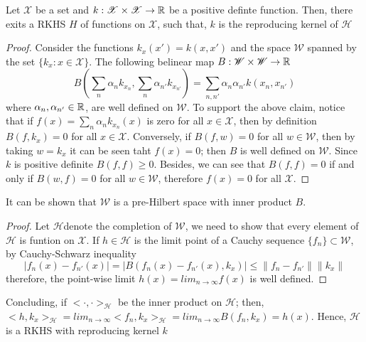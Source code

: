 \begin{theorem}
Let $\mathscr{X}$ be a set and $k: \mathscr{X} \times \mathscr{X} \rightarrow \mathbb{R}$ be a positive definte function. Then, there exits a RKHS $H$ of functions on $\mathscr{X}$, such that, $k$ is the reproducing kernel of $\mathscr{H}$
\end{theorem}

\begin{proof}
 Consider the functions $k_x(x')=k(x,x')$ and the space $\mathscr{W}$ spanned by the set $\{k_x: x \in \mathscr{X} \}$. The following belinear map $B: \mathscr{W} \times \mathscr{W} \rightarrow \mathbb{R}$
 \begin{equation}
     B\left( \sum_n \alpha_nk_{x_n}, \sum_n \alpha_{n'}k_{x_{n'}}\right)=\sum_{n,n'}\alpha_n\alpha_{n'}k(x_{n},x_{n'})
 \end{equation}
 where $\alpha_n, \alpha_{n'} \in \mathbb{R}$, are well defined on $\mathscr{W}$. To support the above claim, notice that if $f(x)=\sum_n\alpha_nk_{x_n}(x)$ is zero for all $x \in \mathscr{X}$, then by definition $B(f,k_x)=0$ for all $x \in \mathscr{X}$. Conversely, if $B(f,w)=0$ for all $w \in \mathscr{W}$, then by taking $w=k_x$ it can be seen taht $f(x)=0$; then $B$ is well defined on $\mathscr{W}$. Since $k$ is positive definite $B(f,f) \geq 0$. Besides, we can see that $B(f,f)=0$ if and only if $B(w,f)=0$ for all $w \in \mathscr{W}$, therefore $f(x)=0$ for all $\mathscr{X}$.
\end{proof}

It can be shown that $\mathscr{W}$ is a pre-Hilbert space with inner product $B$.

\begin{proof}
 Let $\mathscr{H}$denote the completion of $\mathscr{W}$, we need to show that every element of $\mathscr{H}$ is funtion on $\mathscr{X}$. If $h \in \mathscr{H}$ is the limit point of a Cauchy sequence $\{f_n\} \subset \mathscr{W}$, by Cauchy-Schwarz inequality
 \begin{equation}
     |f_n(x)-f_{n'}(x)|=|B(f_n(x)-f_{n'}(x), k_x)| \leq \|f_n-f_{n'}\|\|k_x\|
 \end{equation}
 therefore, the point-wise limit $h(x)=lim_{n \rightarrow \infty} f(x)$ is well defined.
\end{proof}

Concluding, if $<\cdot,\cdot>_{\mathscr{H}}$ be the inner product on $\mathscr{H}$; then, $<h,k_x>_{\mathscr{H}}=lim_{n\rightarrow\infty}<f_n,k_x>_{\mathscr{H}} = lim_{n\rightarrow\infty}B(f_n,k_x)=h(x)$. Hence, $\mathscr{H}$ is a RKHS with reproducing kernel $k$


